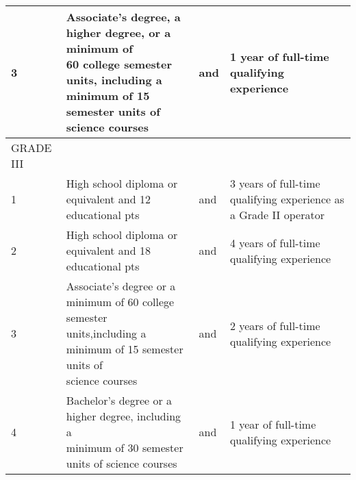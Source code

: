\begin{table}[H]
\begin{tabular}{|l|p{6.5cm}|l|p{6.5cm}|}
3         & \makecell[l]{Associate’s  degree,  a    higher  degree,  or  a minimum   of\\   60  college   semester   units, including a minimum of 15\\semester units of science courses                                                                                                                          } & and & 1     year     of       full-time     qualifying   experience                                   \\ \hline
GRADE III &                                                                                                                                                                                                                                                                                               &     &                                                                                                 \\ \hline
1         & High  school  diploma    or  equivalent  and    12 educational pts                                                                                                                                                                                                                         & and & 3    years    of      full-time    qualifying   experience as a Grade II operator               \\ \hline
2         & High  school  diploma    or  equivalent  and    18 educational pts                                                                                                                                                                                                                         & and & 4    years    of      full-time    qualifying   experience                                      \\ \hline
3         & \makecell[l]{Associate’s  degree  or    a  minimum   of     60 college semester\\ units,including a minimum of 15 semester units of\\science courses                                                                                                                                                      } & and & 2    years    of      full-time    qualifying   experience                                      \\ \hline
4         & \makecell[l]{Bachelor’s   degree   or     a   higher   degree, including a\\ minimum of 30 semester   units of science courses                                                                                                                                                                              } & and & 1     year     of       full-time     qualifying   experience                                   \\ \hline

\end{tabular}
\end{table}
